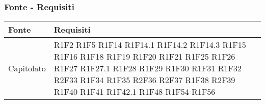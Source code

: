\subsubsection{Fonte - Requisiti}
\begin{center}
	\begin{longtable}{|p{44mm}|p{22mm}|}
		\hline
		\rowcolor{lighter-grayer}
		\textbf{Fonte} &  \textbf{Requisiti}  \\
		\hline
		\endhead
		
		
		Capitolato &
		R1F2 \newline
		R1F5 \newline
		R1F14 \newline
		R1F14.1 \newline
		R1F14.2 \newline
		R1F14.3 \newline
		R1F15 \newline
		R1F16 \newline
		R1F18 \newline
		R1F19 \newline
		R1F20 \newline
		R1F21 \newline
		R1F25 \newline
		R1F26 \newline
		R1F27 \newline
		R1F27.1 \newline
		R1F28 \newline
		R1F29 \newline
		R1F30 \newline
		R1F31 \newline
		R1F32 \newline
		R2F33 \newline
		R1F34 \newline
		R1F35 \newline
		R2F36 \newline
		R2F37 \newline
		R1F38 \newline
		R2F39 \newline
		R1F40 \newline
		R1F41 \newline
		R1F42.1 \newline
		R1F48 \newline
		R1F54 \newline
		R1F56 \newline

\end{longtable}
\end{center}
